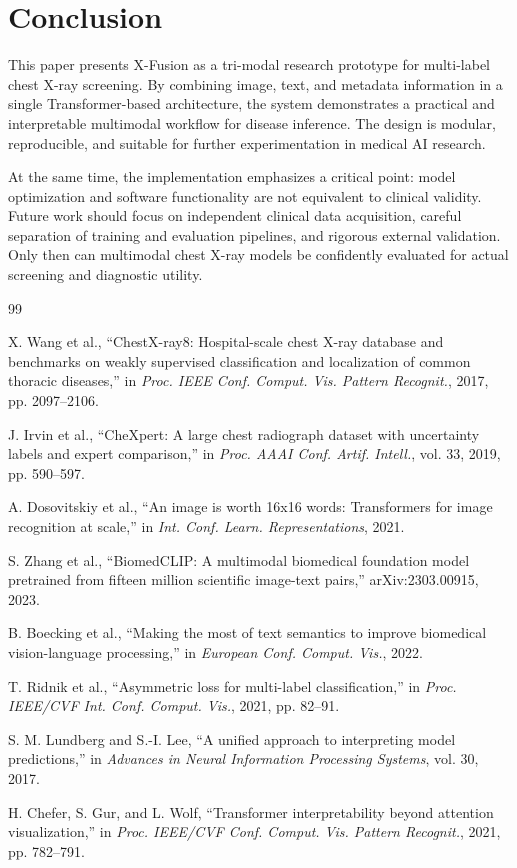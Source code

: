 \documentclass[conference,a4paper]{IEEEtran}
\begin{document}
\section{Conclusion}

This paper presents X-Fusion as a tri-modal research prototype for multi-label chest X-ray screening. By combining image, text, and metadata information in a single Transformer-based architecture, the system demonstrates a practical and interpretable multimodal workflow for disease inference. The design is modular, reproducible, and suitable for further experimentation in medical AI research.

At the same time, the implementation emphasizes a critical point: model optimization and software functionality are not equivalent to clinical validity. Future work should focus on independent clinical data acquisition, careful separation of training and evaluation pipelines, and rigorous external validation. Only then can multimodal chest X-ray models be confidently evaluated for actual screening and diagnostic utility.

\begin{thebibliography}{99}

X. Wang et al., ``ChestX-ray8: Hospital-scale chest X-ray database and benchmarks on weakly supervised classification and localization of common thoracic diseases,'' in \emph{Proc. IEEE Conf. Comput. Vis. Pattern Recognit.}, 2017, pp. 2097--2106.

J. Irvin et al., ``CheXpert: A large chest radiograph dataset with uncertainty labels and expert comparison,'' in \emph{Proc. AAAI Conf. Artif. Intell.}, vol. 33, 2019, pp. 590--597.

A. Dosovitskiy et al., ``An image is worth 16x16 words: Transformers for image recognition at scale,'' in \emph{Int. Conf. Learn. Representations}, 2021.

S. Zhang et al., ``BiomedCLIP: A multimodal biomedical foundation model pretrained from fifteen million scientific image-text pairs,'' arXiv:2303.00915, 2023.

B. Boecking et al., ``Making the most of text semantics to improve biomedical vision-language processing,'' in \emph{European Conf. Comput. Vis.}, 2022.

T. Ridnik et al., ``Asymmetric loss for multi-label classification,'' in \emph{Proc. IEEE/CVF Int. Conf. Comput. Vis.}, 2021, pp. 82--91.

S. M. Lundberg and S.-I. Lee, ``A unified approach to interpreting model predictions,'' in \emph{Advances in Neural Information Processing Systems}, vol. 30, 2017.

H. Chefer, S. Gur, and L. Wolf, ``Transformer interpretability beyond attention visualization,'' in \emph{Proc. IEEE/CVF Conf. Comput. Vis. Pattern Recognit.}, 2021, pp. 782--791.

\end{thebibliography}
\end{document}
